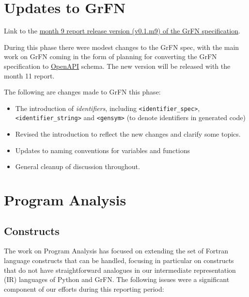 \documentclass[article, 12pt, oneside]{memoir}
\begin{document}
\hypertarget{updates-to-grfn}{%
\section{Updates to GrFN}\label{updates-to-grfn}}

Link to the \href{https://ml4ai.github.io/automates/documentation/deliverable_reports/m09_milestone_report/GrFN_specification_v0.1.m9}{month 9 report release
version (v0.1.m9) of the GrFN specification}.

During this phase there were modest changes to the GrFN spec, with the
main work on GrFN coming in the form of planning for converting the GrFN
specification to
\href{https://swagger.io/docs/specification/about/}{OpenAPI} schema. The
new version will be released with the month 11 report.

The following are changes made to GrFN this phase:

\begin{itemize}
\tightlist
\item
  The introduction of \emph{identifiers}, including
  \texttt{\textless{}identifier\_spec\textgreater{}},
  \texttt{\textless{}identifier\_string\textgreater{}} and
  \texttt{\textless{}gensym\textgreater{}} (to denote identifiers in
  generated code)
\item
  Revised the introduction to reflect the new changes and clarify some
  topics.
\item
  Updates to naming conventions for variables and functions
\item
  General cleanup of discussion throughout.
\end{itemize}

\hypertarget{program-analysis}{%
\section{Program Analysis}\label{program-analysis}}

\hypertarget{constructs}{%
\subsection{Constructs}\label{constructs}}

The work on Program Analysis has focused on extending the set of Fortran
language constructs that can be handled, focusing in particular on
constructs that do not have straightforward analogues in our
intermediate representation (IR) languages of Python and GrFN. The
following issues were a significant component of our efforts during this
reporting period:
\end{document}
